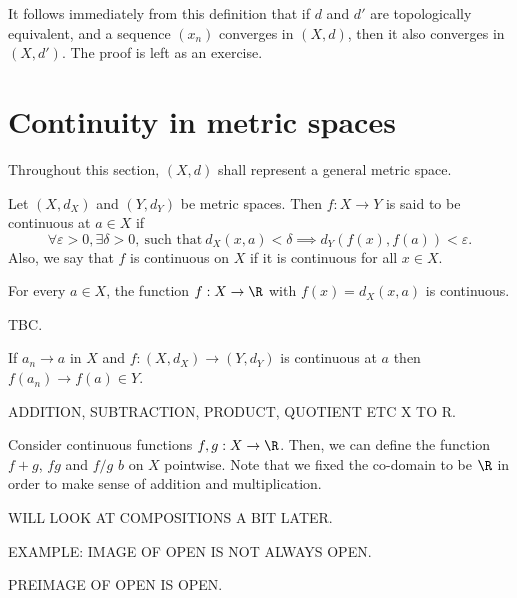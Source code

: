 \documentclass[draft]{penrose}
\begin{document}
It follows immediately from this definition that if $d$ and $d'$ are topologically equivalent, and a sequence $(x_n)$ converges in $(X, d)$, then it also converges in $(X, d')$. The proof is left as an exercise.

\section{Continuity in metric spaces}
Throughout this section, $(X,d)$ shall represent a general metric space.

\begin{ndfn}
  Let $(X, d_X)$ and $(Y, d_Y)$ be metric spaces. Then $f:X \to Y$ is said to be continuous at $a \in X$ if
  \begin{equation*}
    \forall \varepsilon>0, \exists \delta>0,\ \text{such that}\ d_{X}(x,a) < \delta \implies d_{Y}(f(x), f(a)) < \varepsilon.
  \end{equation*}
  Also, we say that $f$ is continuous on $X$ if it is continuous for all $x \in X$.
\end{ndfn}

\begin{negg}
  For every $a \in X$, the function $f:X \to \R$ with $f(x)=d_{X}(x,a)$ is continuous.

  TBC.
\end{negg}

\begin{nlemma}
  If $a_n \to a$ in $X$ and $f:(X, d_X) \to (Y, d_Y)$ is continuous at $a$ then $f(a_n) \to f(a) \in Y$.
\end{nlemma}

ADDITION, SUBTRACTION, PRODUCT, QUOTIENT ETC X TO R.

Consider continuous functions $f,g:X \to \R$. Then, we can define the function $f+g$, $fg$ and $f/g$ $b$ on $X$ pointwise. Note that we fixed the co-domain to be $\R$ in order to make sense of addition and multiplication.

WILL LOOK AT COMPOSITIONS A BIT LATER.

EXAMPLE: IMAGE OF OPEN IS NOT ALWAYS OPEN.



PREIMAGE OF OPEN IS OPEN.
\end{document}
